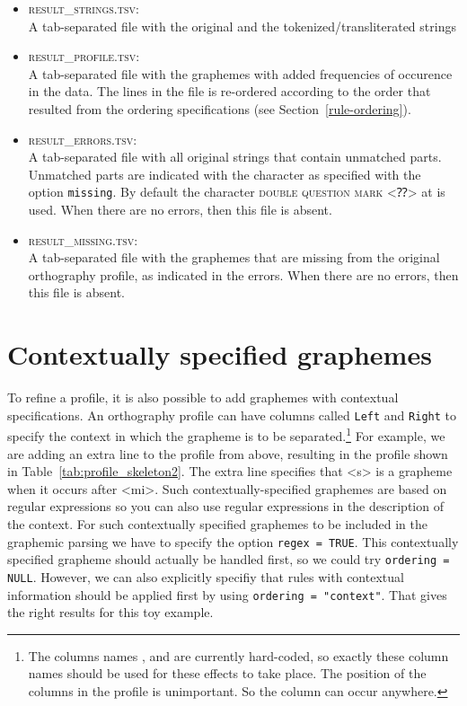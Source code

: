 \begin{itemize}
  
   \item \textsc{result\_strings.tsv}:\\ A tab-separated file with the original
         and the tokenized/transliterated strings

   \item \textsc{result\_profile.tsv}:\\ A tab-separated file with the
         graphemes with added frequencies of occurence in the data. The lines
         in the file is re-ordered according to the order that resulted from the
         ordering specifications (see Section~\ref{rule-ordering}).

   \item \textsc{result\_errors.tsv}:\\ A tab-separated file with all original
         strings that contain unmatched parts. Unmatched parts are indicated
         with the character as specified with the option \texttt{missing}. By
         default the character \textsc{double question mark} <⁇> at
          is used. When there are no errors, then this file is 
         absent.

    \item \textsc{result\_missing.tsv}:\\ A tab-separated file with the graphemes
          that are missing from the original orthography profile, as indicated in
          the errors. When there are no errors, then this file is absent.
          
\end{itemize}

\section{Contextually specified graphemes}
\label{contextual-specification}

To refine a profile, it is also possible to add graphemes with contextual
specifications. An orthography profile can have columns called \texttt{Left} and
\texttt{Right} to specify the context in which the grapheme is to be
separated.\footnote{The columns names ,  and
 are currently hard-coded, so exactly these column names
should be used for these effects to take place. The position of the columns in
the profile is unimportant. So the column  can occur anywhere.}
For example, we are adding an extra line to the profile from above, resulting in
the profile shown in Table~\ref{tab:profile_skeleton2}. The extra line specifies
that <s> is a grapheme when it occurs after <mi>. Such contextually-specified
graphemes are based on regular expressions so you can also use regular
expressions in the description of the context. For such contextually specified
graphemes to be included in the graphemic parsing we have to specify the option
\texttt{regex = TRUE}. This contextually specified grapheme should actually be
handled first, so we could try \texttt{ordering = NULL}. However, we can also
explicitly specifiy that rules with contextual information should be applied
first by using \texttt{ordering = "context"}. That gives the right results for
this toy example.

